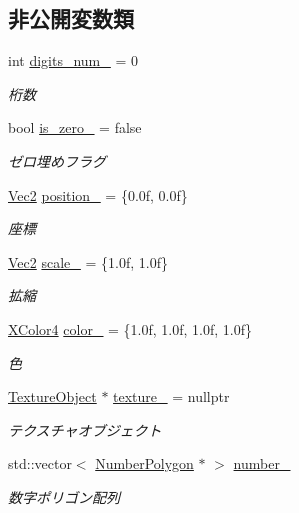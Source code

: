 \subsection*{非公開変数類}
\begin{DoxyCompactItemize}
\item 
int \mbox{\hyperlink{class_numbers_polygon_afd8a869c097a09810c939d8d0cc5449b}{digits\+\_\+num\+\_\+}} = 0
\begin{DoxyCompactList}\small\item\em 桁数 \end{DoxyCompactList}\item 
bool \mbox{\hyperlink{class_numbers_polygon_abd2e99321b113319c1800fc94fe280e3}{is\+\_\+zero\+\_\+}} = false
\begin{DoxyCompactList}\small\item\em ゼロ埋めフラグ \end{DoxyCompactList}\item 
\mbox{\hyperlink{_vector3_d_8h_a5ef6e95dfc5f9d3820b71772d99bbc25}{Vec2}} \mbox{\hyperlink{class_numbers_polygon_a72185b3231ae47ebbd5e4206230b342c}{position\+\_\+}} = \{0.\+0f, 0.\+0f\}
\begin{DoxyCompactList}\small\item\em 座標 \end{DoxyCompactList}\item 
\mbox{\hyperlink{_vector3_d_8h_a5ef6e95dfc5f9d3820b71772d99bbc25}{Vec2}} \mbox{\hyperlink{class_numbers_polygon_a4f2f048ac2e1e8b90079bcce54dfce50}{scale\+\_\+}} = \{1.\+0f, 1.\+0f\}
\begin{DoxyCompactList}\small\item\em 拡縮 \end{DoxyCompactList}\item 
\mbox{\hyperlink{_vector3_d_8h_a680c30c4a07d86fe763c7e01169cd6cc}{X\+Color4}} \mbox{\hyperlink{class_numbers_polygon_aa321020c1bfa1442d2dbbc78adf64481}{color\+\_\+}} = \{1.\+0f, 1.\+0f, 1.\+0f, 1.\+0f\}
\begin{DoxyCompactList}\small\item\em 色 \end{DoxyCompactList}\item 
\mbox{\hyperlink{class_texture_object}{Texture\+Object}} $\ast$ \mbox{\hyperlink{class_numbers_polygon_ae0c6d86da1010bcc128666e60c49c7f8}{texture\+\_\+}} = nullptr
\begin{DoxyCompactList}\small\item\em テクスチャオブジェクト \end{DoxyCompactList}\item 
std\+::vector$<$ \mbox{\hyperlink{class_numbers_polygon_1_1_number_polygon}{Number\+Polygon}} $\ast$ $>$ \mbox{\hyperlink{class_numbers_polygon_a2b613d51e8c7bf7cada11eb546c669e7}{number\+\_\+}}
\begin{DoxyCompactList}\small\item\em 数字ポリゴン配列 \end{DoxyCompactList}\end{DoxyCompactItemize}


